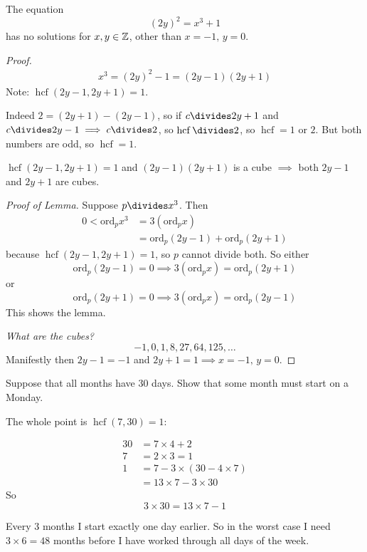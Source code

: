 \documentclass[10pt]{scrartcl}
\DeclareMathOperator{\hcf}{hcf}
\begin{document}
\begin{example}
The equation
\[(2y)^2 = x^3 + 1\]	
has no solutions for $x,y \in\mathbb{Z}$, other than $x =-1,\, y =0$. 

\begin{proof} 
\[
\begin{aligned}
  x^3 = (2y)^2 - 1 = (2y-1)(2y+1)
\end{aligned}
\]
Note: $\hcf(2y-1,2y+1) = 1$. 

Indeed $2 = (2y+1) - (2y-1)$, so if $c \divides 2y + 1$ and $c \divides 2y-1\implies c \divides 2$, so $\hcf\divides 2$, so $\hcf = 1$ or $2$. But both numbers are odd, so $\hcf = 1$.\\

 \begin{lemma} $\hcf(2y-1,2y+1) = 1$ and $(2y-1)(2y+1)$ is a cube $\implies$ both $2y-1$ and $2y+1$ are cubes.
 	
 \end{lemma}

 
 \emph{Proof of Lemma.} Suppose $p \divides x^3$. Then 
 \[
\begin{aligned}
  0 < \mathrm{ord}_px^3 &= 3(\mathrm{ord}_px)\\
  &= \mathrm{ord}_p(2y-1) + \mathrm{ord}_p(2y+1)
\end{aligned}
\]
because $\hcf(2y-1,2y+1) = 1$, so $p$ cannot divide both. So either 
\[\mathrm{ord}_p(2y-1) = 0 \implies 3(\mathrm{ord}_px) = \mathrm{ord}_p(2y+1)\]
or
\[\mathrm{ord}_p(2y+1) = 0 \implies 3(\mathrm{ord}_px) = \mathrm{ord}_p(2y-1)\]
This shows the lemma. 

\emph{What are the cubes?}
\[-1,0,1,8,27,64,125,\dots\]
Manifestly then $2y -1 = -1$ and $2y + 1 = 1\implies x=-1,\, y = 0$.  
\end{proof}
\end{example}\vspace*{10pt}

\begin{example}
Suppose that all months have 30 days. Show that some month must start on a Monday. 

The whole point is $\hcf(7,30)=1$: 

\[
\begin{aligned}
  30 &= 7 \times 4 + 2\\
  7 &= 2 \times 3 = 1\\[0.2cm]
  1 &= 7 -3\times (30 - 4 \times 7)\\
  &= 13 \times 7 - 3 \times 30
\end{aligned}
\]
So 
\[\boxed{3 \times 30 = 13 \times 7 -1}\]

Every 3 months I start exactly one day earlier. So in the worst case I need $3 \times 6 = 48$ months before I have worked through all days of the week. 
\end{example}
\end{document}
